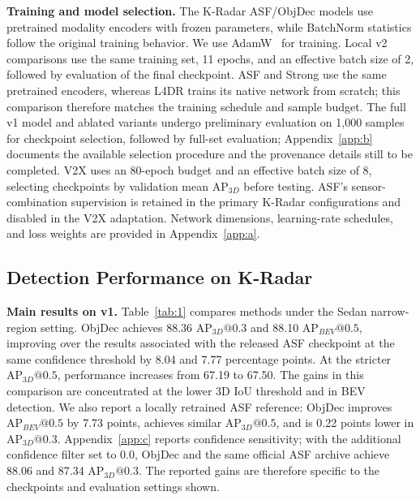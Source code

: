 \textbf{Training and model selection.} The K-Radar ASF/ObjDec models use pretrained modality encoders with frozen parameters, while BatchNorm statistics follow the original training behavior. We use AdamW~\citep{loshchilov2019adamw} for training. Local v2 comparisons use the same training set, 11 epochs, and an effective batch size of 2, followed by evaluation of the final checkpoint. ASF and Strong use the same pretrained encoders, whereas L4DR trains its native network from scratch; this comparison therefore matches the training schedule and sample budget. The full v1 model and ablated variants undergo preliminary evaluation on 1,000 samples for checkpoint selection, followed by full-set evaluation; Appendix~\ref{app:b} documents the available selection procedure and the provenance details still to be completed. V2X uses an 80-epoch budget and an effective batch size of 8, selecting checkpoints by validation mean \(\mathrm{AP}_{3D}\) before testing. ASF's sensor-combination supervision is retained in the primary K-Radar configurations and disabled in the V2X adaptation. Network dimensions, learning-rate schedules, and loss weights are provided in Appendix~\ref{app:a}.

\subsection{Detection Performance on K-Radar}
\label{subsec:42}

\textbf{Main results on v1.} Table~\ref{tab:1} compares methods under the Sedan narrow-region setting. ObjDec achieves 88.36 \(\mathrm{AP}_{3D}@0.3\) and 88.10 \(\mathrm{AP}_{BEV}@0.5\), improving over the results associated with the released ASF checkpoint at the same confidence threshold by 8.04 and 7.77 percentage points. At the stricter \(\mathrm{AP}_{3D}@0.5\), performance increases from 67.19 to 67.50. The gains in this comparison are concentrated at the lower 3D IoU threshold and in BEV detection. We also report a locally retrained ASF reference: ObjDec improves \(\mathrm{AP}_{BEV}@0.5\) by 7.73 points, achieves similar \(\mathrm{AP}_{3D}@0.5\), and is 0.22 points lower in \(\mathrm{AP}_{3D}@0.3\). Appendix~\ref{app:c} reports confidence sensitivity; with the additional confidence filter set to 0.0, ObjDec and the same official ASF archive achieve 88.06 and 87.34 \(\mathrm{AP}_{3D}@0.3\). The reported gains are therefore specific to the checkpoints and evaluation settings shown.

